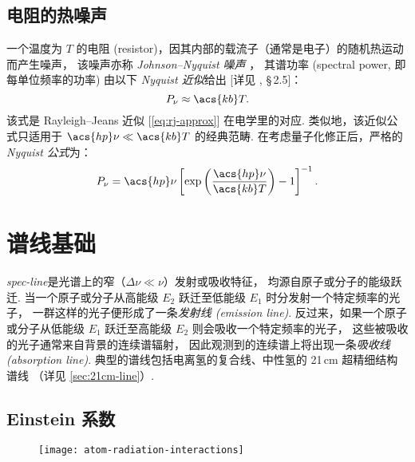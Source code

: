 \subsection{电阻的热噪声}

一个温度为 $T$ 的电阻 (resistor)，因其内部的载流子（通常是电子）的随机热运动而产生噪声，
该噪声亦称 \emph{Johnson--Nyquist 噪声} \cite{johnson1928,nyquist1928}，
其谱功率 (spectral power, 即每单位频率的功率) 由以下 \emph{Nyquist 近似}给出
[详见 , \S\,2.5]：
\begin{equation}
  \label{eq:nyquist-approx}
  P_{\nu} \approx \acs{kb} T .
\end{equation}
该式是 Rayleigh--Jeans 近似 [\autoref{eq:rj-approx}] 在电学里的对应.
类似地，该近似公式只适用于 $\acs{hp}\nu \ll \acs{kb}T$ 的经典范畴.
在考虑量子化修正后，严格的 \emph{Nyquist 公式}为：
\begin{equation}
  \label{eq:nyquist}
  P_{\nu} = \acs{hp} \nu
    \left[ \exp\left( \frac{\acs{hp} \nu}{\acs{kb} T} \right) - 1 \right]^{-1} .
\end{equation}


\section{谱线基础}
\label{sec:spectral-line}

\emph{\acf{spec-line}}是光谱上的窄（$\Delta\nu \ll \nu$）发射或吸收特征，
均源自原子或分子的能级跃迁.
当一个原子或分子从高能级 $E_2$ 跃迁至低能级 $E_1$ 时分发射一个特定频率的光子，
一群这样的光子便形成了一条\emph{发射线 (emission line)}.
反过来，如果一个原子或分子从低能级 $E_1$ 跃迁至高能级 $E_2$ 则会吸收一个特定频率的光子，
这些被吸收的光子通常来自背景的连续谱辐射，
因此观测到的连续谱上将出现一条\emph{吸收线 (absorption line)}.
典型的谱线包括电离氢的复合线、中性氢的 21\,cm 超精细结构谱线
（详见 \autoref{sec:21cm-line}）.

\subsection{Einstein 系数}

\begin{figure}[htp]
  \centering
  \texttt{[image: atom-radiation-interactions]}
  \label{fig:atom-interactions}
\end{figure}

